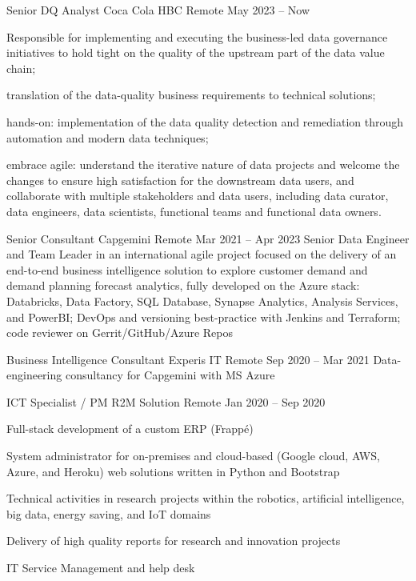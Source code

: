 
  \begin{cventries}
    \cventry
    {Senior DQ Analyst}
    {Coca Cola HBC}    
    {Remote}
    {May 2023 -- Now}
    {
      \begin{cvitems}
        \item{Responsible for implementing and executing the business-led data governance initiatives 
        to hold tight on the quality of the upstream part of the data value chain;}
        \item{translation of the data-quality business requirements to technical solutions;} 
        \item{hands-on: implementation of the data quality detection and remediation through automation and modern data techniques;}
        \item{embrace agile: understand the iterative nature of data projects and welcome the changes to ensure high satisfaction for the downstream data users, and collaborate with multiple stakeholders and data users, including data curator, data engineers, data scientists, functional teams and functional data owners.}
      \end{cvitems}
    }

    \cventry
    {Senior Consultant}
    {Capgemini}    
    {Remote}
    {Mar 2021 -- Apr 2023}
    {Senior Data Engineer and Team Leader in an international agile project focused on the delivery of an end-to-end business intelligence solution to explore customer demand and demand planning forecast analytics, fully developed on the Azure stack: Databricks, Data Factory, SQL Database, Synapse Analytics, Analysis Services, and PowerBI; DevOps and versioning best-practice with Jenkins and Terraform; code reviewer on Gerrit/GitHub/Azure Repos}

    \cventry
    {Business Intelligence Consultant}
    {Experis IT}    
    {Remote}
    {Sep 2020 -- Mar 2021}
    {Data-engineering consultancy for Capgemini with MS Azure}

    \cventry
    {ICT Specialist / PM}
    {R2M Solution}    
    {Remote}
    {Jan 2020 -- Sep 2020}
    {
      \begin{cvitems}
        \item {Full-stack development of a custom ERP (Frappé)}
        \item {System administrator for on-premises and cloud-based (Google cloud, AWS, Azure, and Heroku) web solutions written in Python and Bootstrap}
        \item {Technical activities in research projects within the robotics, artificial intelligence, big data, energy saving, and IoT domains}
        \item {Delivery of high quality reports for research and innovation projects}
        \item {IT Service Management and help desk}
      \end{cvitems}
    }



\end{cventries}
